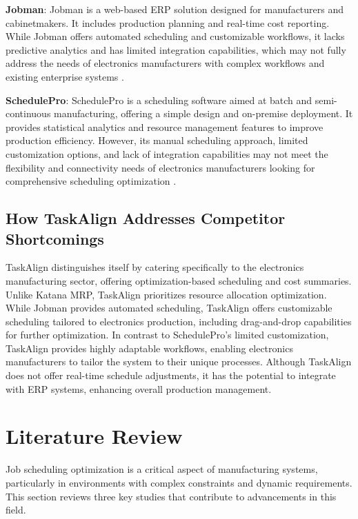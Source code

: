 \textbf{Jobman}: Jobman is a web-based ERP solution designed for manufacturers and cabinetmakers. It includes production planning and real-time cost reporting. While Jobman offers automated scheduling and customizable workflows, it lacks predictive analytics and has limited integration capabilities, which may not fully address the needs of electronics manufacturers with complex workflows and existing enterprise systems \cite{jobman_erp}.

\textbf{SchedulePro}: SchedulePro is a scheduling software aimed at batch and semi-continuous manufacturing, offering a simple design and on-premise deployment. It provides statistical analytics and resource management features to improve production efficiency. However, its manual scheduling approach, limited customization options, and lack of integration capabilities may not meet the flexibility and connectivity needs of electronics manufacturers looking for comprehensive scheduling optimization \cite{schedulepro}.

\subsection{How TaskAlign Addresses Competitor Shortcomings}
TaskAlign distinguishes itself by catering specifically to the electronics manufacturing sector, offering optimization-based scheduling and cost summaries. Unlike Katana MRP, TaskAlign prioritizes resource allocation optimization. While Jobman provides automated scheduling, TaskAlign offers customizable scheduling tailored to electronics production, including drag-and-drop capabilities for further optimization. In contrast to SchedulePro's limited customization, TaskAlign provides highly adaptable workflows, enabling electronics manufacturers to tailor the system to their unique processes. Although TaskAlign does not offer real-time schedule adjustments, it has the potential to integrate with ERP systems, enhancing overall production management.


\section{Literature Review}
\label{section:literature-review}

Job scheduling optimization is a critical aspect of manufacturing systems, particularly in environments with complex constraints and dynamic requirements. This section reviews three key studies that contribute to advancements in this field.

